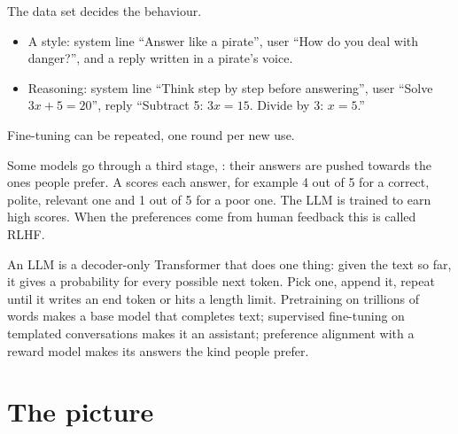 \begin{example}
The data set decides the behaviour.
\begin{itemize}
  \item A style: system line ``Answer like a pirate'', user ``How do you deal with danger?'', and a reply written in a pirate's voice.
  \item Reasoning: system line ``Think step by step before answering'', user ``Solve $3x + 5 = 20$'', reply ``Subtract 5: $3x = 15$. Divide by 3: $x = 5$.''
\end{itemize}
Fine-tuning can be repeated, one round per new use.
\end{example}

\begin{definition}
Some models go through a third stage, : their answers are pushed towards the ones people prefer. A  scores each answer, for example 4 out of 5 for a correct, polite, relevant one and 1 out of 5 for a poor one. The LLM is trained to earn high scores. When the preferences come from human feedback this is called RLHF.
\end{definition}

\begin{sayit}
An LLM is a decoder-only Transformer that does one thing: given the text so far, it gives a probability for every possible next token. Pick one, append it, repeat until it writes an end token or hits a length limit. Pretraining on trillions of words makes a base model that completes text; supervised fine-tuning on templated conversations makes it an assistant; preference alignment with a reward model makes its answers the kind people prefer.
\end{sayit}

\section{The picture}

